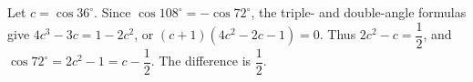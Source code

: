 Let $c=\cos36^\circ$. Since $\cos108^\circ=-\cos72^\circ$, the triple- and double-angle formulas give $4c^3-3c=1-2c^2$, or $(c+1)(4c^2-2c-1)=0$. Thus $2c^2-c=\dfrac{1}{2}$, and $\cos72^\circ=2c^2-1=c-\dfrac{1}{2}$. The difference is $\boxed{\dfrac{1}{2}}$.
